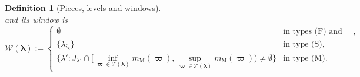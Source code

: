 \documentclass{article}
\numberwithin{equation}{section}
\newtheorem{definition}{Definition}
\begin{document}
\begin{definition}[Pieces, levels and windows]
\begin{equation}
\end{equation}
and its \emph{window} is
\begin{equation}
\label{eq: window}
\mathcal{W}(\boldsymbol{\lambda}) := \begin{cases} \emptyset & \text{in types (F) and (C)}, \\ \{\lambda_{i_{\mathrm{S}}}\} & \text{in type (S)}, \\ \{ \lambda' : J_{\lambda'} \cap [\inf_{\boldsymbol{\varpi} \in \mathcal{T}(\boldsymbol{\lambda})} m_{\mathrm{M}}(\boldsymbol{\varpi}), \sup_{\boldsymbol{\varpi} \in \mathcal{T}(\boldsymbol{\lambda})} m_{\mathrm{M}}(\boldsymbol{\varpi})) \neq \emptyset \} & \text{in type (M)}. \end{cases}
\end{equation}
\end{definition}
\end{document}
